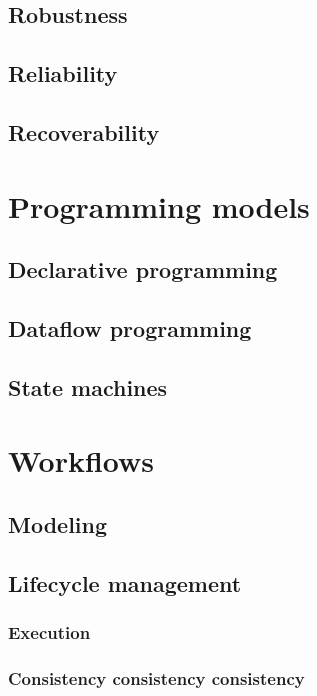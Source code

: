 \documentclass[11pt,a4paper]{article}
\begin{document}
\subsection{Robustness}

\subsection{Reliability}

\subsection{Recoverability}

\section{Programming models}

\subsection{Declarative programming}

\subsection{Dataflow programming}

\subsection{State machines}

\section{Workflows}

\subsection{Modeling}

\subsection{Lifecycle management}

\subsubsection{Execution}

\subsubsection{Consistency consistency consistency}
\end{document}
